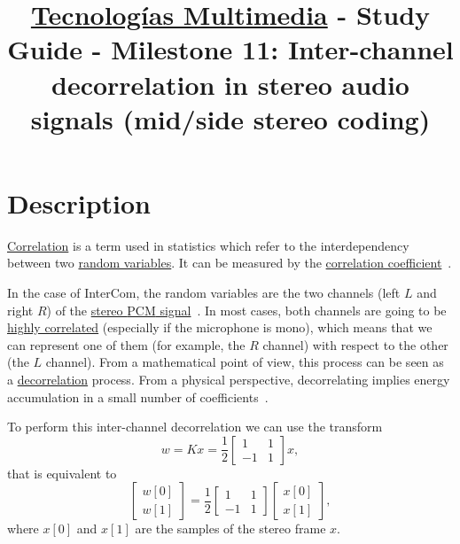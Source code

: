 \title{\href{https://www.ual.es/estudios/grados/presentacion/plandeestudios/asignatura/4015/40154321?idioma=zh_CN}{Tecnologías Multimedia} - Study Guide - Milestone 11: Inter-channel decorrelation in stereo audio signals (mid/side stereo coding)}

\maketitle

\section{Description}

\href{https://en.wikipedia.org/wiki/Correlation_and_dependence}{Correlation}
is a term used in statistics which refer to the interdependency
between two \href{https://en.wikipedia.org/wiki/Random_variable}{random
  variables}. It can be measured by the
\href{https://www.mathsisfun.com/data/correlation.html}{correlation
  coefficient}~\cite{thinkstats}.

In the case of InterCom, the random variables are the two channels
(left $L$ and right $R$) of the
\href{https://en.wikipedia.org/wiki/Stereophonic_sound}{stereo
  \href{https://en.wikipedia.org/wiki/Pulse-code_modulation}{PCM}
  signal}~\cite{bosi2003intro}. In most cases, both channels are going
to be \href{https://en.wikipedia.org/wiki/Binaural_recording}{highly
  correlated} (especially if the microphone is mono), which means that
we can represent one of them (for example, the $R$ channel) with
respect to the other (the $L$ channel). From a mathematical point of
view, this process can be seen as a
\href{https://en.wikipedia.org/wiki/Decorrelation}{decorrelation}
process. From a physical perspective, decorrelating implies energy
accumulation in a small number of coefficients~\cite{sayood2017introduction}.

To perform this inter-channel decorrelation we can use the transform
\begin{equation}
  w = Kx = \frac{1}{2}\begin{bmatrix} 1 & 1 \\ -1 & 1 \end{bmatrix}x,
  \label{eq:forward_transform_matrix_form}
\end{equation}
that is equivalent to
\begin{equation*}
  \begin{bmatrix}
    w[0] \\
    w[1]
  \end{bmatrix}
  = \frac{1}{2}
  \begin{bmatrix} 1 & 1 \\ -1 & 1 \end{bmatrix}
  \begin{bmatrix}
    x[0] \\
    x[1]
  \end{bmatrix},
\end{equation*}
where $x[0]$ and $x[1]$ are the samples of the stereo frame $x$.

